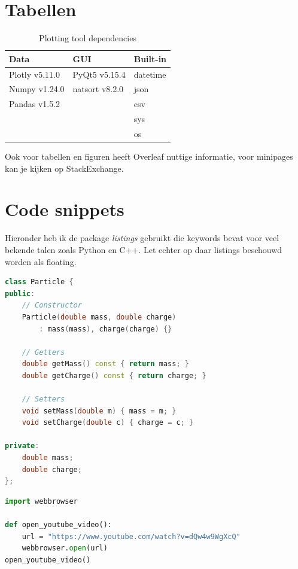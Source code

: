 \documentclass{article}
\begin{document}
\section{Tabellen}

\begin{table}[H]
\centering
\caption{Plotting tool dependencies}
\label{tab:dependencies}
\begin{tabular}{l|l|l}
\rowcolor[HTML]{EFEFEF} 
Data & GUI & Built-in \\ \hline\hline
Plotly v5.11.0 & PyQt5 v5.15.4 & datetime \\ 
Numpy v1.24.0 & natsort v8.2.0 & json \\ 
Pandas v1.5.2 &  & csv \\ 
 &  & sys \\ 
 &  & os \\ 
\end{tabular}
\end{table}

Ook voor tabellen en figuren heeft Overleaf nuttige informatie\cite{OverleafFigures}, voor minipages kan je kijken op StackExchange\cite{StackExchangeMinipage}.

\section{Code snippets}
Hieronder heb ik de package \textit{listings} gebruikt die keywords bevat voor veel bekende talen zoals Python en C++.
Let echter op daar listings beschouwd worden als floating.

\begin{lstlisting}[language=C++]
class Particle {
public:
    // Constructor
    Particle(double mass, double charge) 
        : mass(mass), charge(charge) {}

    // Getters
    double getMass() const { return mass; }
    double getCharge() const { return charge; }

    // Setters
    void setMass(double m) { mass = m; }
    void setCharge(double c) { charge = c; }

private:
    double mass;
    double charge;
};
\end{lstlisting}
\begin{lstlisting}[language=Python,label=listing:python,caption=Python example with caption and label]    
import webbrowser

def open_youtube_video():
    url = "https://www.youtube.com/watch?v=dQw4w9WgXcQ"
    webbrowser.open(url)
open_youtube_video()
\end{lstlisting}
\end{document}
